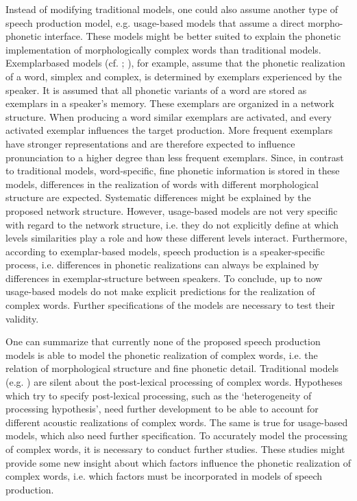 { 
 Instead of modifying traditional models, one could also assume another type of speech production model, e.g. usage-based models that assume a direct morpho-phonetic interface. These models might be better suited to explain the phonetic implementation of morphologically complex words than traditional models. Exemplarbased models (cf. \citealt{Johnson.1997b,Pierrehumbert.2001,Pierrehumbert.2002}; \citealt{Bybee.2002}), for example, assume that the phonetic realization of a word, simplex and complex, is determined by exemplars experienced by the speaker. It is assumed that all phonetic variants of a word are stored as exemplars in a speaker's memory. These exemplars are organized in a network structure. When producing a word similar exemplars are activated, and every activated exemplar influences the target production. More frequent exemplars have stronger representations and are therefore expected to influence pronunciation to a higher degree than less frequent exemplars. 
 Since, in contrast to traditional models, word-specific, fine phonetic  information is stored in these models, differences in the realization of words with different morphological structure are expected. Systematic differences might be explained by the proposed network structure.
 However, usage-based models are not very specific with regard to the network structure, i.e. they do not explicitly define at which levels similarities play a role and how these different levels interact. Furthermore, according to exemplar-based models, speech production is a speaker-specific process, i.e. differences in phonetic realizations can always be explained by differences in exemplar-structure between speakers. To conclude, up to now usage-based models do not make explicit predictions for the realization of complex words. Further specifications of the models are necessary to test their validity.
 

One can summarize that currently none of the proposed speech production models is able to model the phonetic realization of complex words, i.e. the relation of morphological structure and fine phonetic detail.  Traditional models (e.g. \citealt{Dell.1986,Levelt.1999b}) are silent about the post-lexical processing of complex words. Hypotheses which try to specify post-lexical processing, such as the `heterogeneity of processing hypothesis', need further development to be able to account for different acoustic realizations of complex words. The same is true for usage-based models, which also need further specification. To accurately model the processing of complex words, it is necessary to conduct further studies. 
These studies might provide some new insight about which factors influence the 
phonetic realization of complex words, i.e. which factors must be incorporated in models of speech production.
 
}
